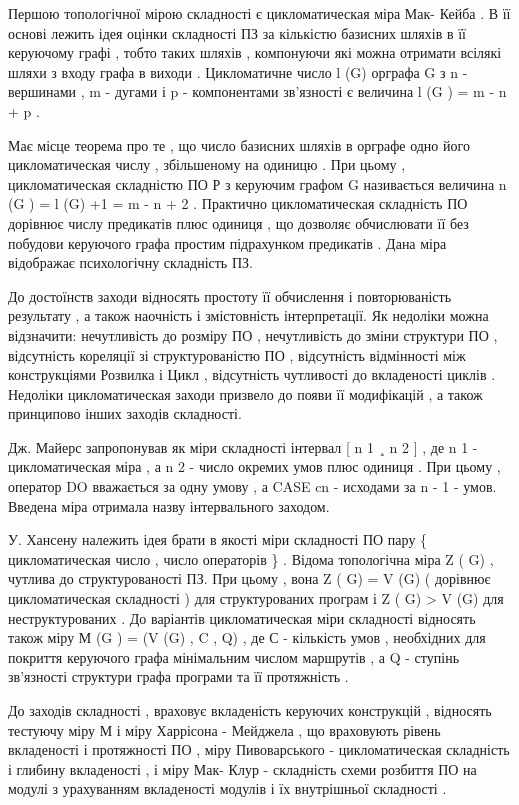 \documentclass[oneside,final,14pt]{extreport}
\begin{document}
Першою топологічної мірою складності є цикломатическая міра Мак- Кейба . В її основі лежить ідея оцінки складності ПЗ за кількістю базисних шляхів в її керуючому графі , тобто таких шляхів , компонуючи які можна отримати всілякі шляхи з входу графа в виходи . Цикломатичне число l (G) орграфа G з n - вершинами , m - дугами і p - компонентами зв'язності є величина l (G ) = m - n + p .

Має місце теорема про те , що число базисних шляхів в орграфе одно його цикломатическая числу , збільшеному на одиницю . При цьому , цикломатическая складністю ПО Р з керуючим графом G називається величина n (G ) = l (G) +1 = m - n + 2 . Практично цикломатическая складність ПО дорівнює числу предикатів плюс одиниця , що дозволяє обчислювати її без побудови керуючого графа простим підрахунком предикатів . Дана міра відображає психологічну складність ПЗ.

До достоїнств заходи відносять простоту її обчислення і повторюваність результату , а також наочність і змістовність інтерпретації. Як недоліки можна відзначити: нечутливість до розміру ПО , нечутливість до зміни структури ПО , відсутність кореляції зі структурованістю ПО , відсутність відмінності між конструкціями Розвилка і Цикл , відсутність чутливості до вкладеності циклів . Недоліки цикломатическая заходи призвело до появи її модифікацій , а також принципово інших заходів складності.

Дж. Майерс запропонував як міри складності інтервал {[} n 1 ¸ n 2 {]} , де n 1 - цикломатическая міра , а n 2 - число окремих умов плюс одиниця . При цьому , оператор DO вважається за одну умову , а CASE cn - исходами за n - 1 - умов. Введена міра отримала назву інтервального заходом.

У. Хансену належить ідея брати в якості міри складності ПО пару \{ цикломатическая число , число операторів \} . Відома топологічна міра Z ( G) , чутлива до структурованості ПЗ. При цьому , вона Z ( G) = V (G) ( дорівнює цикломатическая складності ) для структурованих програм і Z ( G) \textgreater{} V (G) для неструктурованих . До варіантів цикломатическая міри складності відносять також міру М (G ) = (V (G) , C , Q) , де С - кількість умов , необхідних для покриття керуючого графа мінімальним числом маршрутів , а Q - ступінь зв'язності структури графа програми та її протяжність .

До заходів складності , враховує вкладеність керуючих конструкцій , відносять тестуючу міру М і міру Харрісона - Мейджела , що враховують рівень вкладеності і протяжності ПО , міру Пивоварського - цикломатическая складність і глибину вкладеності , і міру Мак- Клур - складність схеми розбиття ПО на модулі з урахуванням вкладеності модулів і їх внутрішньої складності .
\end{document}
